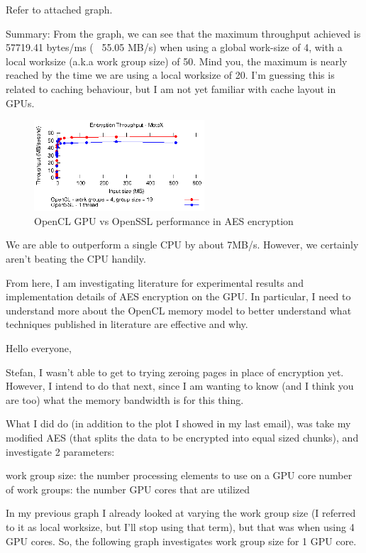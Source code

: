 \documentclass[conference,10pt]{IEEEtran}
\begin{document}
Refer to attached graph.

Summary:
From the graph, we can see that the maximum throughput achieved is 57719.41 bytes/ms (~ 55.05 MB/s) 
when using a global work-size of 4, with a local worksize (a.k.a work group size) of 50. Mind you, 
the maximum is nearly reached by the time we are using a local worksize of 20. I'm guessing this is 
related to caching behaviour, but I am not yet familiar with cache layout in GPUs.




\begin{figure}[!t]
\centering
\includegraphics[width=2.5in]{../final/motox/4.2/opencl_sizes_vs_cpu_sizes.opencl_4G_19L.cpu_1thread.report.eps}
\caption{OpenCL GPU vs OpenSSL performance in AES encryption}
\label{fig:opencl_vs_cpu}
\end{figure}

We are able to outperform a single CPU by about 7MB/s. However, we certainly aren't beating the CPU 
handily.

From here, I am investigating literature for experimental results and implementation details of AES 
encryption on the GPU.  In particular, I need to understand more about the OpenCL memory model to 
better understand what techniques published in literature are effective and why.


Hello everyone,

Stefan, I wasn't able to get to trying zeroing pages in place of encryption yet.  However, I intend 
to do that next, since I am wanting to know (and I think you are too) what the memory bandwidth is 
for this thing.

What I did do (in addition to the plot I showed in my last email), was take my modified AES (that 
splits the data to be encrypted into equal sized chunks), and investigate 2 parameters:

    work group size: the number processing elements to use on a GPU core
    number of work groups: the number GPU cores that are utilized

In my previous graph I already looked at varying the work group size (I referred to it as local 
worksize, but I'll stop using that term), but that was when using 4 GPU cores.  So, the following 
graph investigates work group size for 1 GPU core.
\end{document}
